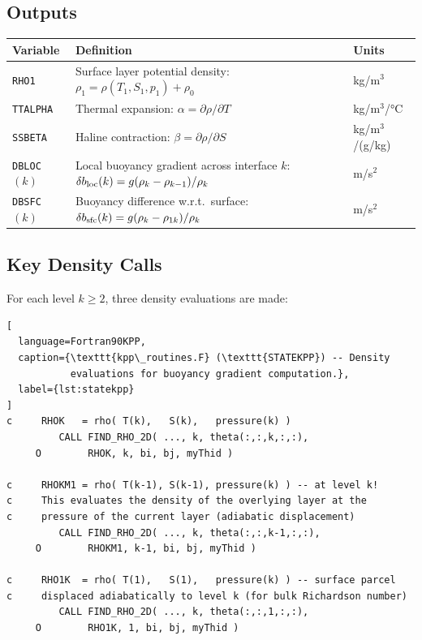 \documentclass[12pt,letterpaper]{article}
\begin{document}
\subsection{Outputs}  
  
\begin{longtable}{lp{8cm}l}  
\toprule  
\textbf{Variable} & \textbf{Definition} & \textbf{Units} \\  
\midrule  
\endhead  
\texttt{RHO1} & Surface layer potential density:  
  $\rho_1 = \rho(T_1, S_1, p_1) + \rho_0$ & kg/m$^3$ \\[4pt]  
\texttt{TTALPHA} & Thermal expansion:  
  $\alpha = \partial\rho/\partial T$ & kg/m$^3$/°C \\[4pt]  
\texttt{SSBETA} & Haline contraction:  
  $\beta = \partial\rho/\partial S$ & kg/m$^3$/(g/kg) \\[4pt]  
\texttt{DBLOC}$(k)$ & Local buoyancy gradient across interface $k$:  
  $\delta b_{\rm loc}(k) = g(\rho_k - \rho_{k-1})/\rho_k$ & m/s$^2$ \\[4pt]  
\texttt{DBSFC}$(k)$ & Buoyancy difference w.r.t.\ surface:  
  $\delta b_{\rm sfc}(k) = g(\rho_k - \rho_{1k})/\rho_k$ & m/s$^2$ \\  
\bottomrule  
\end{longtable}  
  
\subsection{Key Density Calls}  
  
For each level $k \geq 2$, three density evaluations are made:  
  
\begin{lstlisting}[  
  language=Fortran90KPP,  
  caption={\texttt{kpp\_routines.F} (\texttt{STATEKPP}) -- Density  
           evaluations for buoyancy gradient computation.},  
  label={lst:statekpp}  
]  
c     RHOK   = rho( T(k),   S(k),   pressure(k) )  
         CALL FIND_RHO_2D( ..., k, theta(:,:,k,:,:),  
     O        RHOK, k, bi, bj, myThid )  
  
c     RHOKM1 = rho( T(k-1), S(k-1), pressure(k) ) -- at level k!  
c     This evaluates the density of the overlying layer at the  
c     pressure of the current layer (adiabatic displacement)  
         CALL FIND_RHO_2D( ..., k, theta(:,:,k-1,:,:),  
     O        RHOKM1, k-1, bi, bj, myThid )  
  
c     RHO1K  = rho( T(1),   S(1),   pressure(k) ) -- surface parcel  
c     displaced adiabatically to level k (for bulk Richardson number)  
         CALL FIND_RHO_2D( ..., k, theta(:,:,1,:,:),  
     O        RHO1K, 1, bi, bj, myThid )  
\end{lstlisting}  
  
\end{document}
